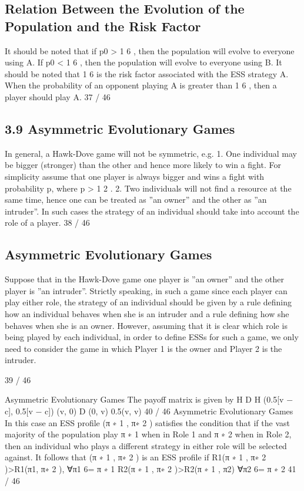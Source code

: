 \documentclass[]{report}
\begin{document}
\subsection{Relation Between the Evolution of the Population and the
Risk Factor}
It should be noted that if p0 >
1
6
, then the population will evolve
to everyone using A.
If p0 <
1
6
, then the population will evolve to everyone using B.
It should be noted that 1
6
is the risk factor associated with the ESS
strategy A. When the probability of an opponent playing A is
greater than 1
6
, then a player should play A.
37 / 46

\subsection{3.9 Asymmetric Evolutionary Games}
In general, a Hawk-Dove game will not be symmetric, e.g.
1. One individual may be bigger (stronger) than the
other and hence more likely to win a fight. For
simplicity assume that one player is always bigger and
wins a fight with probability p, where p >
1
2
.
2. Two individuals will not find a resource at the same
time, hence one can be treated as ”an owner” and
the other as ”an intruder”.
In such cases the strategy of an individual should take into account
the role of a player.
38 / 46

\subsection{Asymmetric Evolutionary Games}
Suppose that in the Hawk-Dove game one player is ”an owner”
and the other player is ”an intruder”.
Strictly speaking, in such a game since each player can play either
role, the strategy of an individual should be given by a rule
defining how an individual behaves when she is an intruder and a
rule defining how she behaves when she is an owner.
However, assuming that it is clear which role is being played by
each individual, in order to define ESSs for such a game, we only
need to consider the game in which Player 1 is the owner and
Player 2 is the intruder.

39 / 46

Asymmetric Evolutionary Games
The payoff matrix is given by
H D
H (0.5[v − c], 0.5[v − c]) (v, 0)
D (0, v) 0.5(v, v)
40 / 46
Asymmetric Evolutionary Games
In this case an ESS profile (π
∗
1
, π∗
2
) satisfies the condition that if
the vast majority of the population play π
∗
1 when in Role 1 and π
∗
2
when in Role 2, then an individual who plays a different strategy in
either role will be selected against.
It follows that (π
∗
1
, π∗
2
) is an ESS profile if
R1(π
∗
1
, π∗
2
)>R1(π1, π∗
2
), ∀π1 6= π
∗
1
R2(π
∗
1
, π∗
2
)>R2(π
∗
1
, π2) ∀π2 6= π
∗
2
41 / 46
\end{document}
